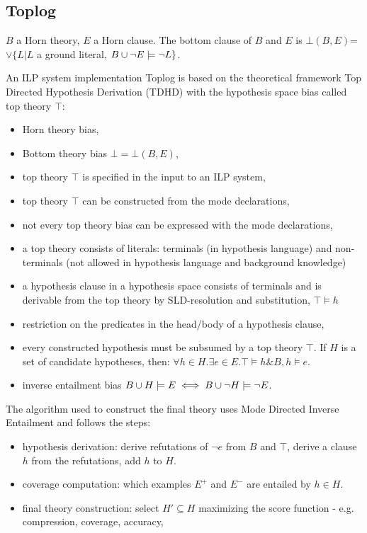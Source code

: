 \subsection{Toplog}
\begin{defn}
$B$ a Horn theory, $E$ a Horn clause. The bottom clause of $B$ and $E$ is $\bot(B,E)$=$\vee\{L | L $ a ground literal, $B \cup {\neg E} \models \neg L\}$.
\end{defn}
An ILP system implementation Toplog is based on the theoretical framework Top Directed Hypothesis Derivation (TDHD) with the hypothesis space bias called top theory $\top$:
\begin{itemize}
\item Horn theory bias,
\item Bottom theory bias $\bot = \bot(B,E)$,
\item top theory $\top$ is specified in the input to an ILP system,
\item top theory $\top$ can be constructed from the mode declarations,
\item not every top theory bias can be expressed with the mode declarations,
\item a top theory consists of literals: terminals (in hypothesis language) and non-terminals (not allowed in hypothesis language and background knowledge)
\item a hypothesis clause in a hypothesis space consists of terminals and is derivable from the top theory by SLD-resolution and substitution, $\top \models h$
\item restriction on the predicates in the head/body of a hypothesis clause,
\item every constructed hypothesis must be subsumed by a top theory $\top$. If $H$ is a set of candidate hypotheses, then: $\forall h \in H. \exists e \in E. \top \models h \& B, h \models e$.
\item inverse entailment bias $B \cup H \models E \iff B \cup \neg H \models \neg E$.
\end{itemize}
The algorithm used to construct the final theory uses Mode Directed Inverse Entailment and follows the steps:
\begin{itemize}
\item hypothesis derivation: derive refutations of $\neg e$ from $B$ and $\top$, derive a clause $h$ from the refutations, add $h$ to $H$.
\item coverage computation: which examples $E^+$ and $E^-$ are entailed by $h \in H$.
\item final theory construction: select $H' \subseteq H$ maximizing the score function - e.g. compression, coverage, accuracy,
\end{itemize}
